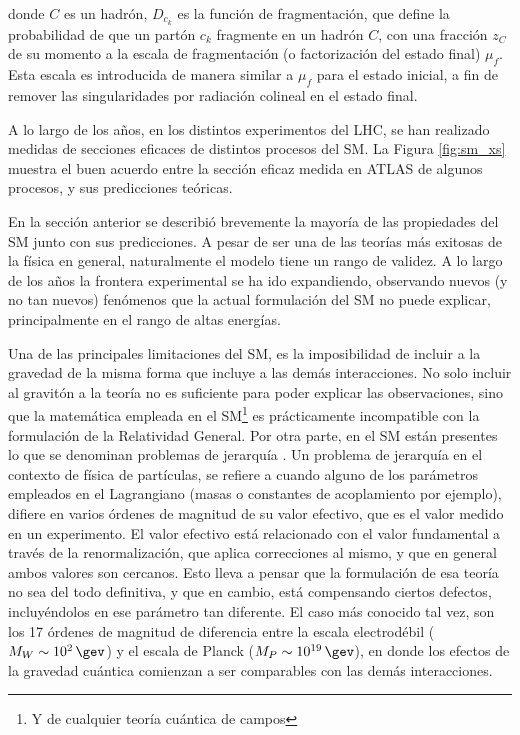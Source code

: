 donde $C$ es un hadrón, $D_{c_k}$ es la función de fragmentación, que define la probabilidad
de que un partón $c_k$ fragmente en un hadrón $C$, con una fracción $z_C$ de su momento a la
escala de fragmentación (o factorización del estado final) $\mu_{f}$. Esta escala es introducida
de manera similar a $\mu_{f}$ para el estado inicial, a fin de remover las singularidades por
radiación colineal en el estado final.

A lo largo de los años, en los distintos experimentos del LHC, se han realizado medidas de secciones eficaces de distintos procesos del SM. La Figura \ref{fig:sm_xs} muestra el buen acuerdo entre la sección eficaz medida en ATLAS de algunos procesos, y sus predicciones teóricas.








En la sección anterior se describió brevemente la mayoría de las propiedades del SM junto con sus predicciones. A pesar de ser una de las teorías más exitosas de la 
física en general,
naturalmente el modelo tiene un rango de validez. A lo largo de los años la frontera experimental se ha ido expandiendo, observando nuevos (y no tan nuevos) fenómenos que la actual formulación del SM no puede explicar, principalmente en el rango de altas energías.

Una de las principales limitaciones del SM, es la imposibilidad de incluir a la gravedad de la misma forma que incluye a las demás interacciones. No solo incluir al gravitón a la teoría no es suficiente para poder explicar las observaciones, sino que la matemática empleada en el SM\footnote{Y de cualquier teoría cuántica de campos} es prácticamente incompatible con la formulación de la Relatividad General. Por otra parte, en el SM están presentes lo que se denominan problemas de jerarquía \cite{tHooft:1980xss}. 
Un problema de jerarquía en el contexto de física de partículas, se refiere a cuando alguno de los parámetros empleados en el Lagrangiano (masas o constantes de acoplamiento por ejemplo), difiere en varios órdenes de magnitud de su valor efectivo, que es el valor medido en un experimento. El valor efectivo está relacionado con el valor fundamental a través de la renormalización, que aplica correcciones al mismo, y que en general ambos valores son cercanos.
Esto lleva a pensar que la formulación de esa teoría no sea del todo definitiva, y que en cambio, está compensando ciertos defectos, incluyéndolos en ese parámetro tan diferente. 
El caso más conocido tal vez, son los 17 órdenes de magnitud de diferencia entre la escala electrodébil ($M_W\sim 10^{2}\,\gev$) y el escala de Planck ($M_P\sim 10^{19}\,\gev$), en donde los efectos de la gravedad cuántica comienzan a ser comparables con las demás interacciones.

